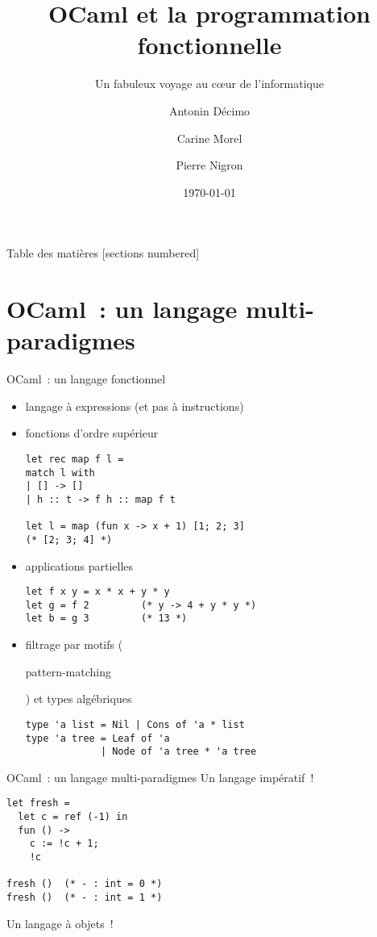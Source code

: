 \documentclass[10pt]{beamer}
\title{OCaml et la programmation fonctionnelle}
\subtitle{Un fabuleux voyage au cœur de l’informatique}
\date{\today}
\author{Antonin Décimo \and Carine Morel \and Pierre Nigron}
\institute{Université Paris Diderot}
\begin{document}
\maketitle

\begin{frame}{Table des matières}
  [sections numbered]
  \tableofcontents[hideallsubsections]
\end{frame}

\section{OCaml~: un langage multi-paradigmes}

\begin{frame}[fragile]{OCaml~: un langage fonctionnel}
  \begin{itemize}
  \item<1-> langage à expressions (et pas à instructions)
  \item<2-> fonctions d'ordre supérieur
\begin{verbatim}
let rec map f l =
match l with
| [] -> []
| h :: t -> f h :: map f t

let l = map (fun x -> x + 1) [1; 2; 3]
(* [2; 3; 4] *)
\end{verbatim}
  \item<3-> applications partielles
\begin{verbatim}
let f x y = x * x + y * y
let g = f 2         (* y -> 4 + y * y *)
let b = g 3         (* 13 *)
\end{verbatim}
  \item<4-> filtrage par motifs
    (\begin{english}pattern-matching\end{english}) et types
    algébriques
\begin{verbatim}
type 'a list = Nil | Cons of 'a * list
type 'a tree = Leaf of 'a
             | Node of 'a tree * 'a tree
\end{verbatim}
  \end{itemize}
\end{frame}

\begin{frame}[fragile]{OCaml~: un langage multi-paradigmes}
  Un langage impératif~!
\begin{verbatim}
let fresh =
  let c = ref (-1) in
  fun () ->
    c := !c + 1;
    !c

fresh ()  (* - : int = 0 *)
fresh ()  (* - : int = 1 *)
\end{verbatim}

  Un langage à objets~!
\end{frame}
\end{document}
